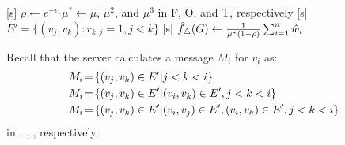 \setlength{\algomargin}{5mm}
\begin{algorithm}[t]
  \SetAlgoLined
  [s] $\rho \leftarrow e^{-\epsilon_1}$\;
  [$v_i$, s] $\mu^* \leftarrow \mu$, $\mu^2$, and $\mu^3$ in F, O, and T, respectively\;
  [s] $E' = \{(v_j, v_k) :r_{k,j} = 1, j < k\}$\;
  [s] $\hat{f}_\triangle(G) \leftarrow \frac{1}{\mu^*(1-\rho)}\sum_{i=1}^n \hat{w}_i$\;
  \caption{Our three algorithms.
  ``F'', ``O'', ``T'' are shorthands for
  \AlgOne{}, \AlgTwo{}, and \AlgThree{}, respectively.
  [$v_i$] and [s] represent that the process is run by $v_i$ and the server, respectively.
  }\label{alg:unify}
\end{algorithm}

Recall that the server calculates a message $M_i$ for $v_i$ as:
\begin{align}
\hspace{-1mm} M_i \hspace{-0.5mm} &= \hspace{-0.5mm} \{(v_j, v_k) \in E' | j<k<i\} \label{eq:M_i_I}\\
\hspace{-1mm} M_i \hspace{-0.5mm} &= \hspace{-0.5mm} \{(v_j, v_k) \in E' | (v_i, v_k) \in E', j<k<i\} \label{eq:M_i_II}\\
\hspace{-1mm} M_i \hspace{-0.5mm} &= \hspace{-0.5mm}  \{(v_j, v_k) \in E' | (v_i, v_j) \in E', (v_i, v_k) \in E', j<k<i\} \label{eq:M_i_III}
\end{align}
in \AlgOne{}, \AlgTwo{}, \AlgThree{}, respectively.

